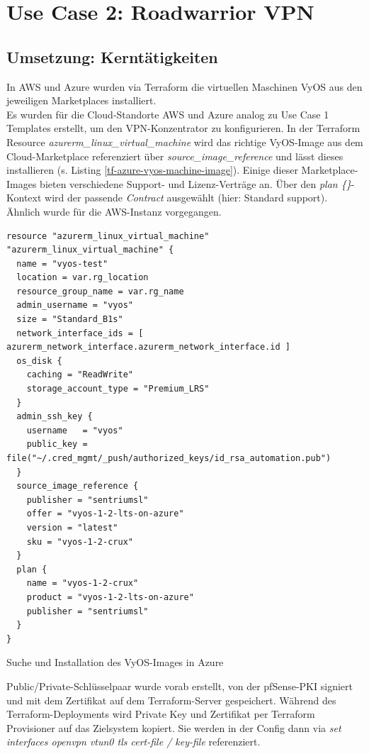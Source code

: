 \section{Use Case 2: Roadwarrior VPN} \label{Use-Case 2: Road Warrior}
\subsection{Umsetzung: Kerntätigkeiten}

In AWS und Azure wurden via Terraform die virtuellen Maschinen VyOS aus den jeweiligen Marketplaces installiert.\\
Es wurden für die Cloud-Standorte AWS und Azure analog zu Use Case 1 Templates erstellt, um den \gls{VPN-Konzentrator} zu konfigurieren. In der Terraform Resource \textit{azurerm\_linux\_virtual\_machine} wird das richtige VyOS-Image aus dem Cloud-Marketplace referenziert über \textit{source\_image\_reference} und lässt dieses installieren (s. Listing \ref{tf-azure-vyos-machine-image}). Einige dieser Market\-place-Images bieten verschiedene Support- und Lizenz-Verträge an. Über den \textit{plan \{\}}-Kontext wird der passende \textit{Contract} ausgewählt (hier: \glqq Standard support\grqq{}). Ähnlich wurde für die AWS-Instanz vorgegangen. 
\begin{listing}[h]
\begin{verbatim}
resource "azurerm_linux_virtual_machine"  "azurerm_linux_virtual_machine" {
  name = "vyos-test"
  location = var.rg_location
  resource_group_name = var.rg_name
  admin_username = "vyos"
  size = "Standard_B1s"
  network_interface_ids = [ azurerm_network_interface.azurerm_network_interface.id ]
  os_disk {
    caching = "ReadWrite"
    storage_account_type = "Premium_LRS"
  }
  admin_ssh_key {
    username   = "vyos"
    public_key = file("~/.cred_mgmt/_push/authorized_keys/id_rsa_automation.pub")
  }
  source_image_reference {
    publisher = "sentriumsl"
    offer = "vyos-1-2-lts-on-azure"
    version = "latest"
    sku = "vyos-1-2-crux"
  }
  plan {
    name = "vyos-1-2-crux"
    product = "vyos-1-2-lts-on-azure"
    publisher = "sentriumsl"
  }
}
\end{verbatim}
\caption{Suche und Installation des VyOS-Images in Azure}
\label{tf-azure-vyos-machine-image}
\end{listing}\FloatBarrier
Public/Private-Schlüsselpaar wurde vorab erstellt, von der pfSense-\gls{PKI} signiert und mit dem Zertifikat auf dem Terraform-Server gespeichert. Während des Terraform-\gls{Deployment}s wird Private Key und Zertifikat per Terraform Provisioner auf das Zielsystem kopiert. Sie werden in der Config dann via \textit{set interfaces openvpn vtun0 tls cert-file / key-file} referenziert.\\
